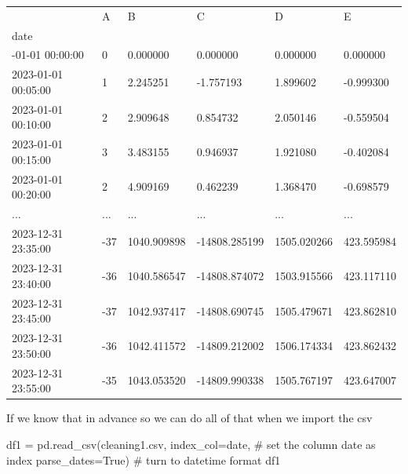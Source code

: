 \documentclass[
  letterpaper,
  DIV=11,
  numbers=noendperiod,
  oneside]{scrreprt}
\newenvironment{Shaded}{\begin{snugshade}}{\end{snugshade}}
\newcommand{\CommentTok}[1]{\textcolor[rgb]{0.37,0.37,0.37}{#1}}
\newcommand{\NormalTok}[1]{\textcolor[rgb]{0.00,0.23,0.31}{#1}}
\newcommand{\OperatorTok}[1]{\textcolor[rgb]{0.37,0.37,0.37}{#1}}
\newcommand{\StringTok}[1]{\textcolor[rgb]{0.13,0.47,0.30}{#1}}
\newcommand{\VariableTok}[1]{\textcolor[rgb]{0.07,0.07,0.07}{#1}}
\begin{document}
\begin{longtable}[]{@{}llllll@{}}
\toprule\noalign{}
& A & B & C & D & E \\
date & & & & & \\
\midrule\noalign{}
\endhead
\bottomrule\noalign{}
\endlastfoot
2023-01-01 00:00:00 & 0 & 0.000000 & 0.000000 & 0.000000 & 0.000000 \\
2023-01-01 00:05:00 & 1 & 2.245251 & -1.757193 & 1.899602 & -0.999300 \\
2023-01-01 00:10:00 & 2 & 2.909648 & 0.854732 & 2.050146 & -0.559504 \\
2023-01-01 00:15:00 & 3 & 3.483155 & 0.946937 & 1.921080 & -0.402084 \\
2023-01-01 00:20:00 & 2 & 4.909169 & 0.462239 & 1.368470 & -0.698579 \\
... & ... & ... & ... & ... & ... \\
2023-12-31 23:35:00 & -37 & 1040.909898 & -14808.285199 & 1505.020266 &
423.595984 \\
2023-12-31 23:40:00 & -36 & 1040.586547 & -14808.874072 & 1503.915566 &
423.117110 \\
2023-12-31 23:45:00 & -37 & 1042.937417 & -14808.690745 & 1505.479671 &
423.862810 \\
2023-12-31 23:50:00 & -36 & 1042.411572 & -14809.212002 & 1506.174334 &
423.862432 \\
2023-12-31 23:55:00 & -35 & 1043.053520 & -14809.990338 & 1505.767197 &
423.647007 \\
\end{longtable}

If we know that in advance so we can do all of that when we import the
csv

\begin{Shaded}
\begin{Highlighting}[]
\NormalTok{df1 }\OperatorTok{=}\NormalTok{ pd.read\_csv(}\StringTok{\textquotesingle{}cleaning1.csv\textquotesingle{}}\NormalTok{, }
\NormalTok{                  index\_col}\OperatorTok{=}\StringTok{\textquotesingle{}date\textquotesingle{}}\NormalTok{,     }\CommentTok{\# set the column date as index }
\NormalTok{                  parse\_dates}\OperatorTok{=}\VariableTok{True}\NormalTok{)     }\CommentTok{\# turn to datetime format}
\NormalTok{df1}
\end{Highlighting}
\end{Shaded}
\end{document}
